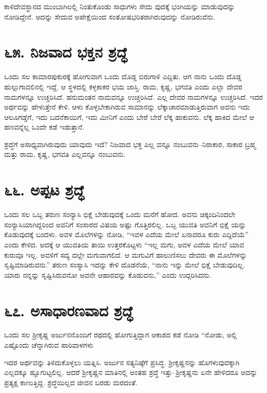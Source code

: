 ಕಾಳಿದೇವಸ್ಥಾನದ ಮುಂಬಾಗಿಲಲ್ಲಿ ನಿಂತುಕೊಂಡು ಸಾಧುಗಳು ಸೇದು ವುದಕ್ಕೆ ಭಂಗಿಯನ್ನು ಮಾಡುವುದನ್ನು ನೋಡಿದ್ದೇನೆ. ಅದನ್ನು ಸೇದುವ ಅಪೇಕ್ಷೆಯಿಂದ ಸಂತೋಷಭರಿತರಾಗಿರುವುದನ್ನು ನೋಡಿರುವೆನು.


\section{\num{೬೫. } ನಿಜವಾದ ಭಕ್ತನ ಶ್ರದ್ಧೆ}

ಒಂದು ಸಲ ಕಾಮಾರಪುಕುರಕ್ಕೆ ಹೋಗುವಾಗ ಒಂದು ದೊಡ್ಡ ಬಿರುಗಾಳಿ ಎದ್ದಿತು. ಆಗ ನಾನು ಒಂದು ದೊಡ್ಡ ಹುಲ್ಲುಗಾವಲಿನಲ್ಲಿ ಇದ್ದೆ. ಆ ಸ್ಥಳದಲ್ಲಿ ಕಳ್ಳಕಾಕರ ಭಯ ಜಾಸ್ತಿ. ರಾಮ, ಕೃಷ್ಣ, ಭಗವತಿ ಎಂದು ಎಲ್ಲಾ ದೇವರ ನಾಮಗಳನ್ನೂ ಉಚ್ಚರಿಸಿದೆ. ಹನುಮಂತನ ನಾಮವನ್ನೂ ಉಚ್ಚರಿಸಿದೆ. ಎಲ್ಲ ದೇವರ ನಾಮಗಳನ್ನೂ ಉಚ್ಚರಿಸಿದೆ. ಇದರ ಅರ್ಥವನ್ನು ಹೇಳುತ್ತೇನೆ ಕೇಳಿ. ಆಳು ಕೊಳ್ಳಬೇಕಾಗಿರುವ ಸಾಮಾನನ್ನು ಲೆಕ್ಕಾಚಾರಮಾಡುತ್ತಿರುವಾಗ ಅವನು ಇದು ಆಲೂಗಡ್ಡೆಗೆ, ಇದು ಬದನೆಕಾಯಿಗೆ, ಇದು ಮೀನಿಗೆ ಎಂದು ಬೇರೆ ಬೇರೆ ಲೆಕ್ಕ ಹಾಕುವನು. ಲೆಕ್ಕ ಹಾಕಿದ ಮೇಲೆ ಆ ಹಣವನ್ನೆಲ್ಲ ಒಂದೇ ಕಡೆ ಇಡುತ್ತಾನೆ.

ಶ್ರದ್ಧೆಗೆ ಅಸಾಧ್ಯವಾಗಿರುವುದು ಯಾವುದು ಇದೆ? ನಿಜವಾದ ಭಕ್ತ ಎಲ್ಲ ವನ್ನೂ ನಂಬುವನು–ನಿರಾಕಾರ, ಸಾಕಾರ ಬ್ರಹ್ಮ ಮತ್ತು ರಾಮ, ಕೃಷ್ಣ, ಭಗವತಿ ಎಲ್ಲವನ್ನೂ ನಂಬುವನು.


\section{\num{೬೬.} ಅಪ್ಪಟ ಶ್ರದ್ಧೆ}

ಒಂದು ಸಲ ಒಬ್ಬ ತರುಣ ಸಂನ್ಯಾಸಿ ಭಿಕ್ಷೆ ಬೇಡುವುದಕ್ಕೆ ಒಂದು ಮನೆಗೆ ಹೋದ. ಅವನು ಚಿಕ್ಕಂದಿನಿಂದಲೇ ಸಂನ್ಯಾಸಿಯಾಗಿದ್ದರಿಂದ ಅವನಿಗೆ ಸಂಸಾರದ ವಿಷಯ ಅಷ್ಟು ಗೊತ್ತಿರಲಿಲ್ಲ. ಒಬ್ಬ ಯುವತಿ ಅವನಿಗೆ ಭಿಕ್ಷೆ ಯನ್ನು ಕೊಡುವುದಕ್ಕೆ ಬಂದಳು. ಅವಳ ಮೊಲೆಗಳನ್ನು ನೋಡಿ, “ಇವಳ ಎದೆಯ ಮೇಲೆ ಏನಾದರೂ ಕುರು ಎದ್ದಿದೆಯೆ” ಎಂದು ಕೇಳಿದ. ಅದಕ್ಕೆ ಆ ಯುವತಿಯ ತಾಯಿ ಉತ್ತರಕೊಟ್ಟಳು “ಇಲ್ಲ ಮಗು, ಅವಳ ಎದೆಯ ಮೇಲೆ ಯಾವ ಕುರುವೂ ಇಲ್ಲ. ಅವಳಿಗೆ ಸದ್ಯ ದಲ್ಲೇ ಮಗುವಾಗಲಿದೆ. ಆ ಮಗುವಿಗೆ ಹಾಲುಣಿಸಲು ದೇವರು ಈ ಮೊಲೆಗಳನ್ನು ಸೃಷ್ಟಿಮಾಡಿರುವನು.” ತರುಣ ಸಂಸ್ಯಾಸಿ ಇದನ್ನು ಕೇಳಿ ದೊಡನೆಯೆ, “ನಾನು ಇನ್ನು ಮೇಲೆ ಭಿಕ್ಷೆ ಬೇಡುವುದಿಲ್ಲ. ಯಾರು ನನ್ನನ್ನು ಸೃಷ್ಟಿಸಿರುವನೋ ಅವನೇ ಆಹಾರವನ್ನು ಕೊಡುವನು,” ಎಂದು ಉದ್ಗರಿಸಿದನು.


\section{\num{೬೭. } ಅಸಾಧಾರಣವಾದ ಶ್ರದ್ಧೆ}

ಒಂದು ಸಲ ಶ್ರೀಕೃಷ್ಣ ಅರ್ಜುನನೊಂದಿಗೆ ರಥದಲ್ಲಿ ಹೋಗುತ್ತಿದ್ದಾಗ ಆಕಾಶದ ಕಡೆ ನೋಡಿ “ನೋಡು, ಅಲ್ಲಿ ಎಷ್ಟೊಂದು ಚೆನ್ನಾಗಿರುವ ಪಾರಿವಾಳಗಳು

ಇದರ ಅರ್ಥವನ್ನು ತಿಳಿದುಕೊಳ್ಳಲು ಯತ್ನಿಸಿ. ಅರ್ಜುನ ಸತ್ಯನಿಷ್ಠೆಗೆ ಪ್ರಸಿದ್ಧ. ಶ್ರೀಕೃಷ್ಣನನ್ನು ಹೊಗಳುವುದಕ್ಕಾಗಿ ಎಲ್ಲದಕ್ಕೂ ಹ್ಞೂಗುಟ್ಟಲಿಲ್ಲ. ಆದರೆ ಶ್ರೀಕೃಷ್ಣನ ಮಾತಿನಲ್ಲಿ ಅಂತಹ ಶ್ರದ್ಧೆ ಇತ್ತು–ಶ್ರೀಕೃಷ್ಣನು ಏನೇ ಹೇಳಿದರೂ ಅದನ್ನು ಪ್ರತ್ಯಕ್ಷ ಕಾಣುತ್ತಿದ್ದ. ಶ್ರದ್ಧೆಯಿಲ್ಲದ ಜೀವನ ಬರಡು ಮರದಂತೆ.


